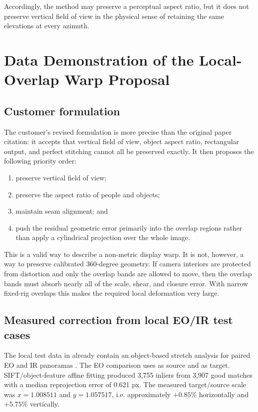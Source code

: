 \documentclass[10pt]{article}
\begin{document}
Accordingly, the method may preserve a perceptual aspect ratio, but it does not preserve vertical field of view in the physical sense of retaining the same elevations at every azimuth.

\section{Data Demonstration of the Local-Overlap Warp Proposal}

\subsection{Customer formulation}

The customer's revised formulation is more precise than the original paper citation: it accepts that vertical field of view, object aspect ratio, rectangular output, and perfect stitching cannot all be preserved exactly. It then proposes the following priority order:

\begin{enumerate}
  \item preserve vertical field of view;
  \item preserve the aspect ratio of people and objects;
  \item maintain seam alignment; and
  \item push the residual geometric error primarily into the overlap regions rather than apply a cylindrical projection over the whole image.
\end{enumerate}

This is a valid way to describe a non-metric display warp. It is not, however, a way to preserve calibrated 360-degree geometry. If camera interiors are protected from distortion and only the overlap bands are allowed to move, then the overlap bands must absorb nearly all of the scale, shear, and closure error. With narrow fixed-rig overlaps this makes the required local deformation very large.

\subsection{Measured correction from local EO/IR test cases}

The local test data in  already contain an object-based stretch analysis for paired EO and IR panoramas \cite{testcases}. The EO comparison uses  as source and  as target. SIFT/object-feature affine fitting produced 3,755 inliers from 3,907 good matches with a median reprojection error of 0.621 px. The measured target/source scale was $x=1.008511$ and $y=1.057517$, i.e. approximately $+0.85\%$ horizontally and $+5.75\%$ vertically.
\end{document}
